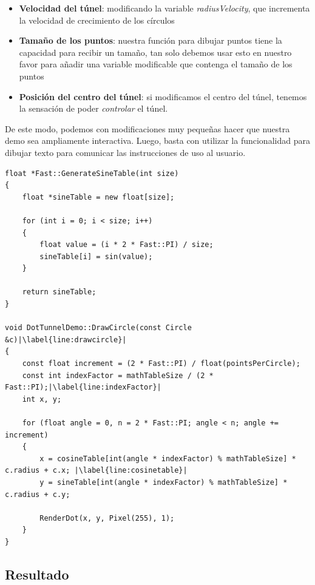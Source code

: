 \begin{itemize}
	\begin{itemize}
		\item \textbf{Velocidad del túnel}: modificando la variable \emph{radiusVelocity}, que incrementa la velocidad de crecimiento de los círculos
		\item \textbf{Tamaño de los puntos}: nuestra función para dibujar puntos tiene la capacidad para recibir un tamaño, tan solo debemos usar esto en nuestro favor para añadir una variable modificable que contenga el tamaño de los puntos
		\item \textbf{Posición del centro del túnel}: si modificamos el centro del túnel, tenemos la sensación de poder \emph{controlar} el túnel.
	\end{itemize}
	
	De este modo, podemos con modificaciones muy pequeñas hacer que nuestra demo sea ampliamente interactiva. Luego, basta con utilizar la funcionalidad para dibujar texto para comunicar las instrucciones de uso al usuario.
	
\end{itemize}

\begin{lstlisting}[style=C-color, caption={Generación de tablas precalculadas y uso en código}, label=cod:generatesinetable, escapechar=|]
float *Fast::GenerateSineTable(int size)
{
    float *sineTable = new float[size];

    for (int i = 0; i < size; i++)
    {
        float value = (i * 2 * Fast::PI) / size;
        sineTable[i] = sin(value);
    }

    return sineTable;
}

void DotTunnelDemo::DrawCircle(const Circle &c)|\label{line:drawcircle}|
{
    const float increment = (2 * Fast::PI) / float(pointsPerCircle);
    const int indexFactor = mathTableSize / (2 * Fast::PI);|\label{line:indexFactor}|
    int x, y;

    for (float angle = 0, n = 2 * Fast::PI; angle < n; angle += increment)
    {
        x = cosineTable[int(angle * indexFactor) % mathTableSize] * c.radius + c.x; |\label{line:cosinetable}|
        y = sineTable[int(angle * indexFactor) % mathTableSize] * c.radius + c.y;
        
        RenderDot(x, y, Pixel(255), 1);
    }
}
\end{lstlisting}

\subsection{Resultado}

